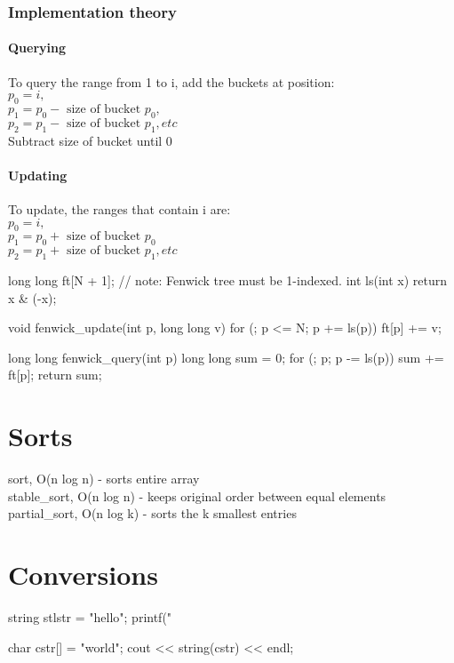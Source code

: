 \documentclass{article}
\begin{document}
\subsubsection{Implementation theory}
\paragraph{Querying}
To query the range from 1 to i, add the buckets at position:\\
\(p_0 = i,\)\\
\(p_1 = p_0 - \text{ size of bucket } p_0,\)\\
\(p_2 = p_1 - \text{ size of bucket } p_1,etc\)\\
Subtract size of bucket until 0
\paragraph{Updating}
To update, the ranges that contain i are:\\
\(p_0 = i,\)\\
\(p_1 = p_0 + \text{ size of bucket } p_0\)\\
\(p_2 = p_1 + \text{ size of bucket } p_1, etc \) \\


\begin{mylisting}{}
long long ft[N + 1]; // note: Fenwick tree must be 1-indexed.
int ls(int x) { return x & (-x); }

void fenwick_update(int p, long long v){
	for (; p <= N; p += ls(p)) ft[p] += v;
}

long long fenwick_query(int p){
	long long sum = 0;
	for (; p; p -= ls(p)) sum += ft[p];
	return sum;
}
\end{mylisting}

\section{Sorts}
sort, O(n log n)            -   sorts entire array\\
stable\_sort, O(n log n)    -   keeps original order between equal elements\\
partial\_sort, O(n log k)   -   sorts the k smallest entries

\section{Conversions}
\begin{mylisting}{}
string stlstr = "hello";
printf("%

char cstr[] = "world";
cout << string(cstr) << endl;
\end{mylisting}
\end{document}

